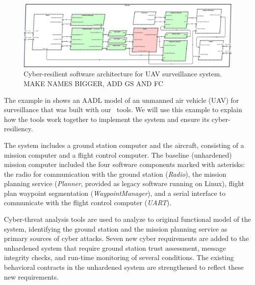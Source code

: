 \begin{figure}
	\begin{center}
	  \includegraphics[width=\textwidth]{./figs/sw-hardened.png}
  \end{center}
	\caption{Cyber-resilient software architecture for UAV surveillance system. MAKE NAMES BIGGER, ADD GS AND FC} 
	\label{fig:sw-hardened} 
\end{figure}

The example in  shows an AADL model
of an unmanned air vehicle (UAV) for surveillance that was built with our \briefcase \ tools.  
We will use this example to explain how the tools work together to implement the system
and ensure its cyber-resiliency.  

The system includes a ground station computer and the aircraft, consisting of a mission computer and 
a flight control computer.  
The baseline (unhardened) mission computer included the four software components marked with asterisks: 
the radio for communication with the ground station (\emph{Radio}), 
the mission planning service (\emph{Planner}, provided as legacy software running on Linux), 
flight plan waypoint segmentation (\emph{WaypointManager}), 
and a serial interface to communicate with the flight control computer (\emph{UART}).

%
Cyber-threat analysis tools are used to analyze to original functional model of the system, 
identifying the ground station and the mission planning
service as primary sources of cyber attacks.
Seven new cyber requirements are added to the unhardened system that require ground station
trust assessment, message integrity checks, and run-time monitoring of several conditions.
The existing behavioral contracts in the unhardened system are strengthened to reflect these new requirements.

